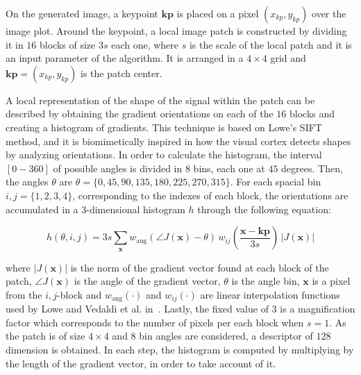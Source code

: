 \documentclass[entropy,article,submit,moreauthors,pdftex,10pt,a4paper]{mdpi}
\begin{document}
On the generated image, a keypoint $\mathbf{kp}$ is placed on a pixel $(x_{kp}, y_{kp})$ over the image plot.   Around the keypoint, a local image patch is constructed by dividing it in $16$ blocks of size $3s$ each one,  where $s$ is the scale of the local patch and it is an input parameter of the algorithm. It is arranged in a $4 \times 4$ grid and $ \mathbf{kp} = (x_{kp},y_{kp})$ is the patch center. 

A local representation of the shape of the signal within the patch can be described by obtaining the gradient orientations on each of the $16$ blocks and creating a histogram of gradients.  This technique is based on Lowe's SIFT~\citep{Lowe2004} method, and it is biomimetically inspired in how the visual cortex detects shapes by analyzing orientations.   In order to calculate the histogram, the interval $[0-360]$ of possible angles is divided in $8$ bins, each one at $45$ degrees.
Then, the angles $\theta$  are $ \theta = \{0, 45, 90, 135, 180, 225, 270, 315\} $. For each spacial bin $ i,j = \{1,2,3,4\} $, corresponding to the indexes of each block,  the orientations are accumulated in a  $3$-dimensional histogram $h$ through the following equation: %

\begin{equation}
 h(\theta,i,j) = 3s \sum_{\mathbf{x}} w_\mathrm{ang}(\angle J(\mathbf{x}) - \theta)\, w_{ij}\left(\frac{\mathbf{x} - \mathbf{kp}}{3 s}\right)\, |J(\mathbf{x})|
\label{eq:histogram}
\end{equation}


\noindent  where $ |J(\mathbf{x})| $ is the norm of the gradient vector found at each block of the patch, $\angle J(\mathbf{x}) $ is the angle of the gradient vector,  $\theta$ is the angle bin, $\mathbf{x}$ is a pixel from  the $i,j$-block and $ w_\mathrm{ang}(\cdot) $  and $ w_{ij}(\cdot) $ are linear interpolation functions used by Lowe and Vedaldi et al. in~\citep{Lowe2004,Vedaldi2010}.  Lastly, the fixed value of $ 3 $ is a magnification factor which corresponds to the number of pixels per each block when $s = 1$.  As the patch is of size $4 \times 4$ and  $8$ bin angles are considered, a descriptor of $128$ dimension is obtained. In each step, the histogram is computed by multiplying by the length of the gradient vector, in order to take account of it. 
\end{document}
